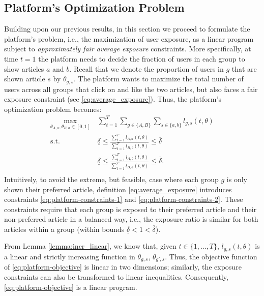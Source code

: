 \documentclass[letterpaper]{article} %
\begin{document}
\subsection{Platform's Optimization Problem}\label{sec:platform_optimization_problem}
Building upon our previous results, in this section we proceed to formulate the  platform's problem, i.e., the maximization of user exposure, as a linear program subject to \emph{approximately fair average exposure} constraints.
%
More specifically, at time $t=1$ the platform needs to decide the fraction of users in each group to show articles $a$ and $b$.
%
Recall that we denote the proportion of users in $g$ that are shown article $s$ by $\theta_{g,s}$.
%
The platform wants to maximize the total number of users across all groups that click on and like the two articles, but also faces
a fair exposure constraint (see \eqref{eq:average_exposure}).
%
Thus, the platform's optimization problem  becomes:
\footnotesize
\begin{align*}
    \tag{P}
    \max_{\theta_{A,a}, \theta_{B,a}\in [0,1]} \ &\sum_{t = 1}^T \sum_{g\in \{A,B\}}\sum_{s\in \{a,b\}} l_{g,s}(t,\theta) \label{eq:platform-objective}\\
    \tag{C1}
    \text{s.t.} \ & 
    \underline{\delta} \leq \frac{\sum_{t=1}^T l_{A,a}(t,\theta)}{\sum_{t=1}^T l_{B,b}(t,\theta)}  \leq \overline{\delta}
    \label{eq:platform-constraints-1}  \\
    \tag{C2}
    &\underline{\delta}\leq \frac{\sum_{t=1}^T l_{A,b}(t,\theta)}{\sum_{t=1}^T l_{B,a}(t,\theta)}  \leq \overline{\delta}.
    \label{eq:platform-constraints-2} \\
\end{align*}
\normalsize
%
Intuitively, to avoid the extreme, but feasible, case where each group $g$ is only shown their preferred article, definition \eqref{eq:average_exposure} introduces constraints \eqref{eq:platform-constraints-1} and \eqref{eq:platform-constraints-2}.
%
These constraints require that each group is exposed to their preferred article and their non-preferred article in a balanced way, i.e., the exposure ratio is similar for both articles within a group (within bounds $\underline{\delta} <1 < \overline{\delta}$).

From Lemma \ref{lemma:incr_linear}, we know that, given $t \in \{1,\dots,T\}$, $l_{g,s}(t,\theta)$ is a linear and strictly increasing function in $\theta_{g,s}$, $\theta_{g',s}$.
%
Thus, the objective function of \eqref{eq:platform-objective} is  linear in two dimensions; similarly, the exposure constraints can also be transformed to linear inequalities.
%
Consequently, \eqref{eq:platform-objective} is a linear program. 
\end{document}
